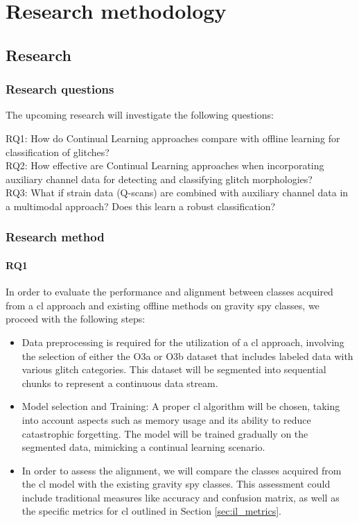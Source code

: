 \chapter{Research methodology}
\label{ch-3}
\section{Research}
\label{sec-Research}
\subsection{Research questions}
The upcoming research will investigate the following questions:  

\begin{mdframed}[backgroundcolor=lightgray!20]
\par RQ1: How do  Continual Learning approaches compare with offline learning for classification of glitches?\\%
RQ2: How effective are Continual Learning approaches when incorporating auxiliary channel data for detecting and classifying glitch morphologies?\\
RQ3: What if strain data (Q-scans) are combined with auxiliary channel data in a multimodal approach? Does this learn a robust classification?
\end{mdframed}

\subsection{Research method}
\label{subsec-researchmethod}
\subsubsection{RQ1}
In order to evaluate the performance and alignment between classes acquired from a \acrlong{cl} approach and existing offline methods on gravity spy classes, we proceed with the following steps:
\begin{itemize}
    \item Data preprocessing is required for the utilization of a \acrshort{cl} approach, involving the selection of either the O3a or O3b dataset that includes labeled data with various glitch categories. This dataset will be segmented into sequential chunks to represent a continuous data stream.
    \item Model selection and Training: A proper \acrshort{cl} algorithm will be chosen, taking into account aspects such as memory usage and its ability to reduce catastrophic forgetting. The model will be trained gradually on the segmented data, mimicking a continual learning scenario.
    \item In order to assess the alignment, we will compare the classes acquired from the \acrshort{cl} model with the existing gravity spy classes. This assessment could include traditional measures like accuracy and confusion matrix, as well as the specific metrics for \acrshort{cl} outlined in Section \ref{sec:il_metrics}. 
\end{itemize}
